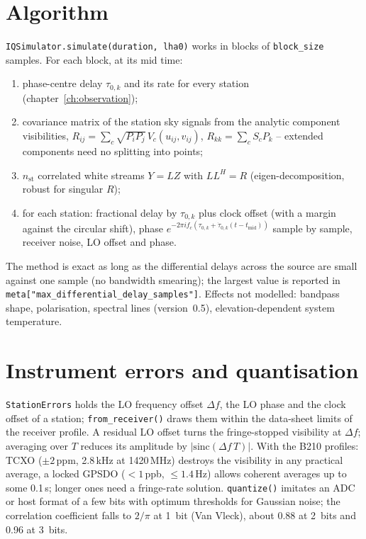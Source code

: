 \section{Algorithm}

\texttt{IQSimulator.simulate(duration, lha0)} works in blocks of
\texttt{block\_size} samples. For each block, at its mid time:
\begin{enumerate}
  \item phase-centre delay $\tau_{0,k}$ and its rate for every station
        (chapter~\ref{ch:observation});
  \item covariance matrix of the station sky signals from the analytic
        component visibilities,
        $R_{ij} = \sum_c\sqrt{P_iP_j}\,V_c(u_{ij},v_{ij})$,
        $R_{kk} = \sum_c S_c P_k$ -- extended components need no splitting
        into points;
  \item $n_\mathrm{st}$ correlated white streams $Y = L Z$ with
        $LL^H = R$ (eigen-decomposition, robust for singular $R$);
  \item for each station: fractional delay by $\tau_{0,k}$ plus clock
        offset (with a margin against the circular shift), phase
        $e^{-2\pi i f_c(\tau_{0,k}+\dot\tau_{0,k}(t-t_\mathrm{mid}))}$
        sample by sample, receiver noise, LO offset and phase.
\end{enumerate}
The method is exact as long as the differential delays across the source
are small against one sample (no bandwidth smearing); the largest value is
reported in \texttt{meta["max\_differential\_delay\_samples"]}. Effects not
modelled: bandpass shape, polarisation, spectral lines (version~0.5),
elevation-dependent system temperature.

\section{Instrument errors and quantisation}

\texttt{StationErrors} holds the LO frequency offset $\Delta f$, the LO
phase and the clock offset of a station; \texttt{from\_receiver()} draws them
within the data-sheet limits of the receiver profile. A residual LO offset
turns the fringe-stopped visibility at $\Delta f$; averaging over $T$
reduces its amplitude by $|\mathrm{sinc}(\Delta f\,T)|$. With the B210
profiles: TCXO ($\pm 2$\,ppm, 2.8\,kHz at 1420\,MHz) destroys the
visibility in any practical average, a locked GPSDO ($< 1$\,ppb,
$\le 1.4$\,Hz) allows coherent averages up to some 0.1\,s; longer ones
need a fringe-rate solution. \texttt{quantize()} imitates an ADC or host
format of a few bits with optimum thresholds for Gaussian noise; the
correlation coefficient falls to $2/\pi$ at 1~bit (Van Vleck), about 0.88
at 2~bits and 0.96 at 3~bits.

